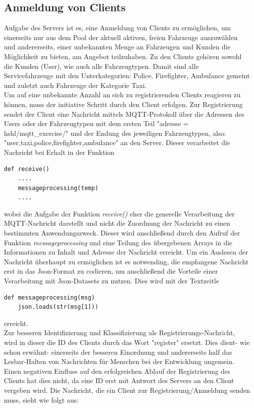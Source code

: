 \subsection{Anmeldung von Clients}
Aufgabe des Servers ist es, eine Anmeldung von Clients zu ermöglichen, um einerseits nur aus dem Pool der aktuell aktiven, freien Fahrzeuge auszuwählen und andererseits, einer unbekannten Menge an Fahrzeugen und Kunden die Möglichkeit zu bieten, am Angebot teilzuhaben. Zu den Clients gehören sowohl die Kunden (User), wie auch alle Fahrzeugtypen. Damit sind alle Servicefahrzeuge mit den Unterkategorien: Police, Firefighter, Ambulance gemeint und zuletzt auch Fahrzeuge der Kategorie Taxi.\\
Um auf eine unbekannte Anzahl an sich zu registrierenden Clients reagieren zu können, muss der initiative Schritt durch den Client erfolgen. Zur Registrierung sendet der Client eine Nachricht mittels MQTT-Protokoll über die Adressen des Users oder der Fahrzeugtypen mit dem ersten Teil \textsf{"adresse = hshl/mqtt\_exercise/"} und der Endung des jeweiligen Fahrzeugtypen, also: \textsf{"user,taxi,police,firefighter,ambulance"} an den Server. Dieser verarbeitet die Nachricht bei Erhalt in der Funktion
\begin{lstlisting}
def receive()
	....
	messageprocessing(temp)
	....
\end{lstlisting}
 wobei die Aufgabe der Funktion \textit{receive()} eher die generelle Verarbeitung der MQTT-Nachricht darstellt und nicht die Zuordnung der Nachricht zu einen bestimmten Anwendungszweck.
Dieser wird anschließend durch den Aufruf der Funktion \textit{messageprocessing} und eine Teilung des übergebenen Arrays in die Informationen zu Inhalt und Adresse der Nachricht erreicht.
Um ein Auslesen der Nachricht überhaupt zu ermöglichen ist es notwending, die empfangene Nachricht erst in das Json-Format zu codieren, um anschließend die Vorteile einer Verarbeitung mit Json-Datasets zu nutzen. Dies wird mit der Textzeitle \begin{lstlisting}
def messageprocessing(msg)
	json.loads(str(msg[1]))
\end{lstlisting}
 erreicht.\\
 Zur besseren Identifizierung und Klassifizierung als Registrierungs-Nachricht, wird in dieser die ID des Clients durch das Wort "register" ersetzt. Dies dient- wie schon erwähnt- einerseits der besseren Einordnung und andererseits half das Lesbar-Halten von Nachrichten für Menschen bei der Entwicklung ungemein. Einen negativen Einfluss auf den erfolgreichen Ablauf der Registrierung des Clients hat dies nicht, da eine ID erst mit Antwort des Servers an den Client vergeben wird. Die Nachricht, die ein Client zur Registrierung/Anmeldung senden muss, sieht wie folgt aus:
